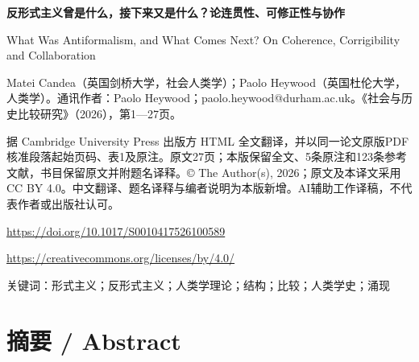 \documentclass[10pt,a4paper]{article}
\begin{document}
{\Large\bfseries 反形式主义曾是什么，接下来又是什么？论连贯性、可修正性与协作\par}\medskip
What Was Antiformalism, and What Comes Next? On Coherence, Corrigibility and Collaboration\par
Matei Candea（英国剑桥大学，社会人类学）；Paolo Heywood（英国杜伦大学，人类学）。通讯作者：Paolo Heywood；paolo.heywood@durham.ac.uk。《社会与历史比较研究》（2026），第1—27页。\par
据 Cambridge University Press 出版方 HTML 全文翻译，并以同一论文原版PDF核准段落起始页码、表1及原注。原文27页；本版保留全文、5条原注和123条参考文献，书目保留原文并附题名译释。© The Author(s), 2026；原文及本译文采用 CC BY 4.0。中文翻译、题名译释与编者说明为本版新增。AI辅助工作译稿，不代表作者或出版社认可。\par
\url{https://doi.org/10.1017/S0010417526100589}\par
\url{https://creativecommons.org/licenses/by/4.0/}\par
关键词：形式主义；反形式主义；人类学理论；结构；比较；人类学史；涌现\par\bigskip
{}\section*{摘要 / Abstract}
\end{document}
